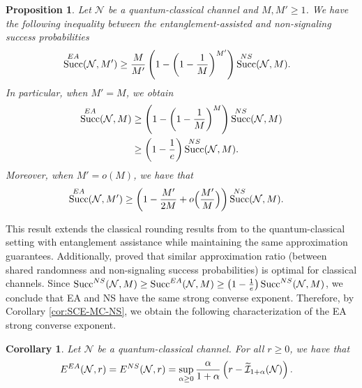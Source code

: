\documentclass[a4paper,onecolumn,11pt,accepted=2025-10-01]{quantumarticle}
\newtheorem{prop}[theorem]{Proposition}
\newtheorem{cor}[theorem]{Corollary}
\DeclareMathOperator{\suc}{Succ}
\newcommand*{\cI}{\mathcal{I}}
\newcommand*{\cN}{\mathcal{N}}
\begin{document}
\begin{prop}\label{prop:rounding-qc}
Let $\cN$ be a quantum-classical channel and $M, M'\ge 1$. We have the following inequality between the entanglement-assisted and non-signaling success probabilities
  \begin{align}
       &\suc^{\rm{EA}}(\cN,M')
       \ge  \frac{M}{M'}\left(1-\left(1-\frac{1}{M}\right)^{M'}\right) \suc^{\rm{NS}}(\cN,M).
    \end{align}
    In particular, when $M'=M$, we obtain 
     \begin{align}
       \suc^{\rm{EA}}(\cN,M)
       &\ge  \left(1-\left(1-\frac{1}{M}\right)^{M}\right) \suc^{\rm{NS}}(\cN,M)
       \\&\ge  \left(1-\frac{1}{e}\right) \suc^{\rm{NS}}(\cN,M).
    \end{align}
    Moreover, when $M'=o(M)$, we have that 
    \begin{align}
        \suc^{\rm{EA}}(\cN,M')
        &\ge \left( 1-\frac{M'}{2M} + o\Big(\frac{M'}{M}\Big)\right) \suc^{\rm{NS}}(\cN,M).
    \end{align}
\end{prop}

This result extends the classical rounding results from \cite{barman2017algorithmic} to the quantum-classical setting with entanglement assistance while maintaining the same approximation guarantees. Additionally, \cite{barman2017algorithmic} proved that similar approximation ratio (between shared randomness and non-signaling success probabilities) is optimal for classical channels.  Since $\suc^{\rm{NS}}(\cN,M) \ge \suc^{\rm{EA}}(\cN,M) \ge \left(1-\frac{1}{e}\right) \suc^{\rm{NS}}(\cN,M)$, we conclude that EA and NS have the same strong converse exponent. Therefore, by Corollary \ref{cor:SCE-MC-NS}, we obtain  the following characterization of the EA strong converse exponent.

\begin{cor}
    Let  $\cN$ be a quantum-classical channel. For all $r\ge 0$, we have  that 
 \begin{align}
     E^{\rm{EA}}(\cN, r) &= E^{\rm{NS}}(\cN, r)
     =\sup_{\alpha\ge 0}  \frac{\alpha}{1+\alpha}\left( r- \widetilde{\cI}_{1+\alpha}(\cN) \right). 
    \end{align}
\end{cor}
\end{document}
